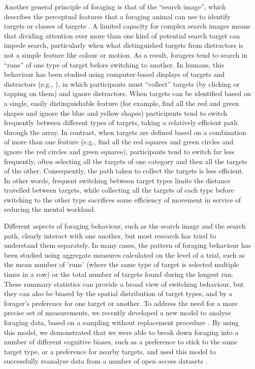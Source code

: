 \documentclass[vision,article,accept,pdftex,moreauthors]{Definitions/mdpi}
\begin{document}
Another general principle of foraging is that of the “search image”, which describes the perceptual features that a foraging animal can use to identify targets or classes of targets \cite{Dukas1993}. A limited capacity for complex search images means that dividing attention over more than one kind of potential search target can impede search, particularly when what distinguished targets from distractors is not a simple feature like colour or motion. As a result, foragers tend to search in “runs” of one type of target before switching to another. In humans, this behaviour has been studied using computer-based displays of targets and distractors (e.g., \citep{kristjansson2014}), in which participants must “collect” targets (by clicking or tapping on them) and ignore distractors. When targets can be identified based on a single, easily distinguishable feature (for example, find all the red and green shapes and ignore the blue and yellow shapes) participants tend to switch frequently between different types of targets, taking a relatively efficient path through the array. In contrast, when targets are defined based on a combination of more than one feature (e.g., find all the red squares and green circles and ignore the red circles and green squares), participants tend to switch far less frequently, often selecting all the targets of one category and then all the targets of the other. Consequently, the path taken to collect the targets is less efficient. In other words, frequent switching between target types limits the distance travelled between targets, while collecting all the targets of each type before switching to the other type sacrifices some efficiency of movement in service of reducing the mental workload. 

Different aspects of foraging behaviour, such as the search image and the search path, clearly interact with one another, but most research has tried to understand them separately. In many cases, the pattern of foraging behaviour has been studied using aggregate measures calculated on the level of a trial, such as the mean number of 'runs' (where the same type of target is selected multiple times in a row) or the total number of targets found during the longest run. These summary statistics can provide a broad view of switching behaviour, but they can also be biased by the spatial distribution of target types, and by a forager's preference for one target or another. To address the need for a more precise set of measurements, we recently developed a new model to analyse foraging data, based on a sampling without replacement procedure \cite{clarke2022foraging}. By using this model, we demonstrated that we were able to break down foraging into a number of different cognitive biases, such as a preference to stick to the same target type, or a preference for nearby targets, and used this model to successfully reanalyse data from a number of open access datasets \cite{kristjansson2014, thornton2022foraging, clarke2022, tagu_kristjansson_2021}. 
\end{document}
